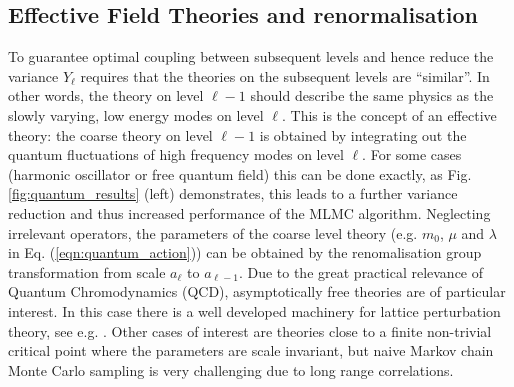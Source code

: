 \documentclass[11pt]{article}
\begin{document}
\subsection{Effective Field Theories and renormalisation}
To guarantee optimal coupling between subsequent levels and hence reduce the variance $Y_\ell$ requires that the theories on the subsequent levels are ``similar''. In other words, the theory on level $\ell-1$ should describe the same physics as the slowly varying, low energy modes on level $\ell$. This is the concept of an effective theory: the coarse theory on level $\ell-1$ is obtained by integrating out the quantum fluctuations of high frequency modes on level $\ell$. For some cases (harmonic oscillator or free quantum field) this can be done exactly, as Fig. \ref{fig:quantum_results} (left) demonstrates, this leads to a further variance reduction and thus increased performance of the MLMC algorithm. Neglecting irrelevant operators, the parameters of the coarse level theory (e.g. $m_0$, $\mu$ and $\lambda$ in Eq. (\ref{eqn:quantum_action})) can be obtained by the renomalisation group transformation from scale $a_\ell$ to $a_{\ell-1}$. Due to the great practical relevance of Quantum Chromodynamics (QCD), asymptotically free theories are of particular interest. In this case there is a well developed machinery for lattice perturbation theory, see e.g. \cite{Hart2009}. Other cases of interest are theories close to a finite non-trivial critical point where the parameters are scale invariant, but naive Markov chain Monte Carlo sampling is very challenging due to long range correlations.
\end{document}
